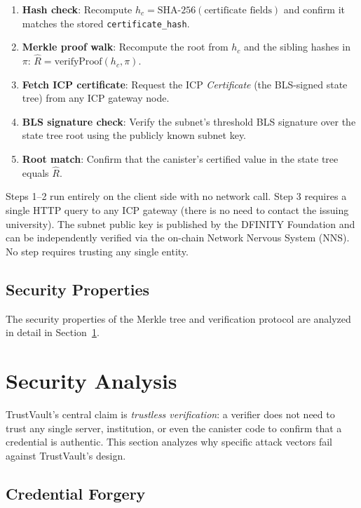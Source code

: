 \documentclass[conference]{IEEEtran}
\begin{document}
\begin{enumerate}
  \item \textbf{Hash check}: Recompute $h_c = \text{SHA-256}(\text{certificate fields})$ and confirm it matches the stored \texttt{certificate\_hash}.
  \item \textbf{Merkle proof walk}: Recompute the root from $h_c$ and the sibling hashes in $\pi$: $\hat{R} = \text{verifyProof}(h_c, \pi)$.
  \item \textbf{Fetch ICP certificate}: Request the ICP \emph{Certificate} (the BLS-signed state tree) from any ICP gateway node.
  \item \textbf{BLS signature check}: Verify the subnet's threshold BLS signature over the state tree root using the publicly known subnet key.
  \item \textbf{Root match}: Confirm that the canister's certified value in the state tree equals $\hat{R}$.
\end{enumerate}

Steps 1--2 run entirely on the client side with no network call. Step 3 requires a single HTTP query to any ICP gateway (there is no need to contact the issuing university). The subnet public key is published by the DFINITY Foundation and can be independently verified via the on-chain Network Nervous System (NNS). No step requires trusting any single entity.

\subsection{Security Properties}
\label{subsec:secprop}

The security properties of the Merkle tree and verification protocol are analyzed in detail in Section~\ref{sec:security}.

\section{Security Analysis}
\label{sec:security}

TrustVault's central claim is \emph{trustless verification}: a verifier does not need to trust any single server, institution, or even the canister code to confirm that a credential is authentic. This section analyzes why specific attack vectors fail against TrustVault's design.

\subsection{Credential Forgery}
\end{document}
